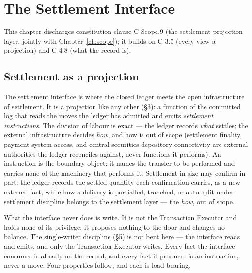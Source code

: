 \documentclass[11pt,a4paper]{article}
\begin{document}

\section{The Settlement Interface}\label{ch:settlement}

This chapter discharges constitution clause C-Scope.9 (the settlement-projection layer, jointly with Chapter~\ref{ch:scope}); it builds on C-3.5 (every view a projection) and C-4.8 (what the record is).

\subsection{Settlement as a projection}

The settlement interface is where the closed ledger meets the open infrastructure
of settlement. It is a projection like any other (\S3): a function of the committed
log that reads the moves the ledger has admitted and emits \emph{settlement
instructions}. The division of labour is exact --- the ledger records \emph{what}
settles; the external infrastructure decides \emph{how}, and how is out of scope
(settlement finality, payment-system access, and central-securities-depository
connectivity are external authorities the ledger reconciles against, never
functions it performs). An instruction is the boundary object: it names the
transfer to be performed and carries none of the machinery that performs it.
Settlement in size may confirm in part: the ledger records the settled quantity each
confirmation carries, as a new external fact, while how a delivery is partialled,
tranched, or auto-split under settlement discipline belongs to the settlement layer ---
the \emph{how}, out of scope.

What the interface never does is write. It is not the Transaction Executor and
holds none of its privilege; it proposes nothing to the door and changes no
balance. The single-writer discipline (\S5) is not bent here --- the interface
reads and emits, and only the Transaction Executor writes. Every fact the interface
consumes is already on the record, and every fact it produces is an instruction,
never a move. Four properties follow, and each is load-bearing.
\end{document}
